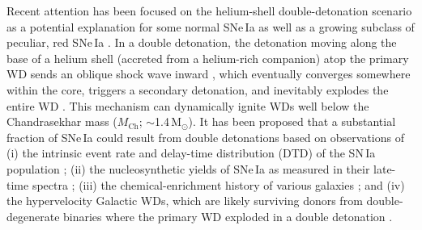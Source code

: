 \documentclass[twocolumn]{aastex631}
\newcommand{\Mch}{$M_\mathrm{Ch}$}
\begin{document}
\begin{CJK*}{UTF8}{gbsn}
Recent attention has been focused on the helium-shell double-detonation scenario as a potential explanation for some normal SNe\,Ia \citep[e.g.,][]{polin_observational_2019,Shen_2D_2021} as well as a growing subclass of peculiar, red SNe\,Ia \citep[e.g.,][]{jiang_16jhr_2017, de_18byg_2019,Liu_20jgb_2023}. In a double detonation, the detonation moving along the base of a helium shell (accreted from a helium-rich companion) atop the primary WD sends an oblique shock wave inward \citep[e.g.,][]{Fink_DD_2010}, which eventually converges somewhere within the core, triggers a secondary detonation, and inevitably explodes the entire WD \citep{Nomoto_1982a,Nomoto_1982b,Woosley_1986,Livne_1990,Woosley_1994,Livne_1995}. This mechanism can dynamically ignite WDs well below the Chandrasekhar mass (\Mch; $\sim$1.4\,$\mathrm{M_\odot}$). It has been proposed that a substantial fraction of SNe\,Ia could result from double detonations based on observations of (i) the intrinsic event rate and delay-time distribution (DTD) of the SN\,Ia population \citep{Ruiter_2011,Ruiter_2014}; (ii) the nucleosynthetic yields of SNe\,Ia as measured in their late-time spectra \citep{Maguire_2018,Flors_2020}; (iii) the chemical-enrichment history of various galaxies \citep{Kirby_2019,de_los_reyes_manganese_2020,Sanders_2021,Eitner_2022}; and (iv) the hypervelocity Galactic WDs, which are likely surviving donors from double-degenerate binaries where the primary WD exploded in a double detonation \citep{Shen_2018,El-Badry_2023}.


\end{CJK*}
\end{document}

